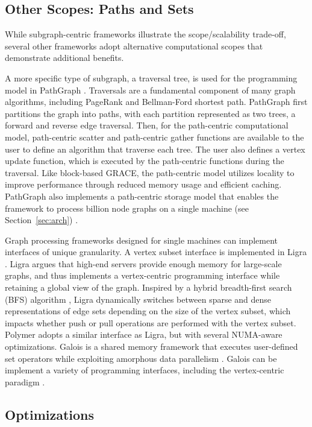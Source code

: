 \documentclass[reprint,twocolumn,showpacs,preprintnumbers,amsmath, aps,pre,amssymb]{revtex4-1}
\begin{document}
\subsection{Other Scopes: Paths and Sets}

While subgraph-centric frameworks illustrate the scope/scalability trade-off, several other frameworks adopt alternative computational scopes that demonstrate additional benefits.

A more specific type of subgraph, a traversal tree, is used for the programming model in PathGraph \cite{Yuan}.  Traversals are a fundamental component of many graph algorithms, including PageRank and Bellman-Ford shortest path.  PathGraph first partitions the graph into paths, with each partition represented as two trees, a forward and reverse edge traversal.  Then, for the path-centric computational model, path-centric scatter and path-centric gather functions are available to the user to define an algorithm that traverse each tree.  The user also defines a vertex update function, which is executed by the path-centric functions during the traversal.  Like block-based GRACE, the path-centric model utilizes locality to improve performance through reduced memory usage and efficient caching.  PathGraph also implements a path-centric storage model that enables the framework to process billion node graphs on a single machine (see Section~\ref{sec:arch}) \cite{Yuan}.

Graph processing frameworks designed for single machines can implement interfaces of unique granularity.  A vertex subset interface is implemented in Ligra \cite{Shun2013}.  Ligra argues that high-end servers provide enough memory for large-scale graphs, and thus implements a vertex-centric programming interface while retaining a global view of the graph.  Inspired by a hybrid breadth-first search (BFS) algorithm \cite{Beamer2013}, Ligra dynamically switches between sparse and dense representations of edge sets depending on the size of the vertex subset, which impacts whether push or pull operations are performed with the vertex subset.  Polymer \cite{Zhang2015} adopts a similar interface as Ligra, but with several NUMA-aware optimizations.  Galois \cite{Kulkarni2007} is a shared memory framework that executes user-defined set operators while exploiting amorphous data parallelism \cite{pingali11}.  Galois can be implement a variety of programming interfaces, including the vertex-centric paradigm \cite{Nguyen2013}.

\subsection{Optimizations}
\label{subsec:scope_opt}
\end{document}
